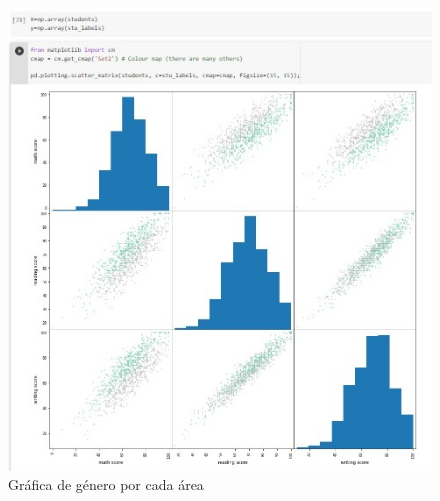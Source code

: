 \documentclass[conference,compsoc,onecolumn]{IEEEtran}
\begin{document}
        \begin{figure}[H]       
            \centering
            \includegraphics[scale = 0.80]{j.jpg}
            \caption{Gráfica de género por cada área}
            \label{subfigura16}
        \end{figure}
        
\end{document}
